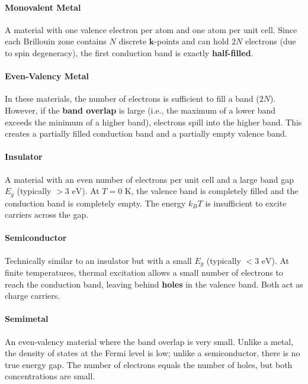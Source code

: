 \documentclass[10pt, a4paper]{article}
\begin{document}
\paragraph{Monovalent Metal}
A material with one valence electron per atom and one atom per unit cell. Since each Brillouin zone contains $N$ discrete $\mathbf{k}$-points and can hold $2N$ electrons (due to spin degeneracy), the first conduction band is exactly \textbf{half-filled}.

\paragraph{Even-Valency Metal}
In these materials, the number of electrons is sufficient to fill a band ($2N$). However, if the \textbf{band overlap} is large (i.e., the maximum of a lower band exceeds the minimum of a higher band), electrons spill into the higher band. This creates a partially filled conduction band and a partially empty valence band.

\paragraph{Insulator}
A material with an even number of electrons per unit cell and a large band gap $E_g$ (typically $> 3 \text{ eV}$). At $T = 0 \text{ K}$, the valence band is completely filled and the conduction band is completely empty. The energy $k_B T$ is insufficient to excite carriers across the gap.

\paragraph{Semiconductor}
Technically similar to an insulator but with a small $E_g$ (typically $< 3 \text{ eV}$). At finite temperatures, thermal excitation allows a small number of electrons to reach the conduction band, leaving behind \textbf{holes} in the valence band. Both act as charge carriers.

\paragraph{Semimetal}
An even-valency material where the band overlap is very small. Unlike a metal, the density of states at the Fermi level is low; unlike a semiconductor, there is no true energy gap. The number of electrons equals the number of holes, but both concentrations are small.
\end{document}
